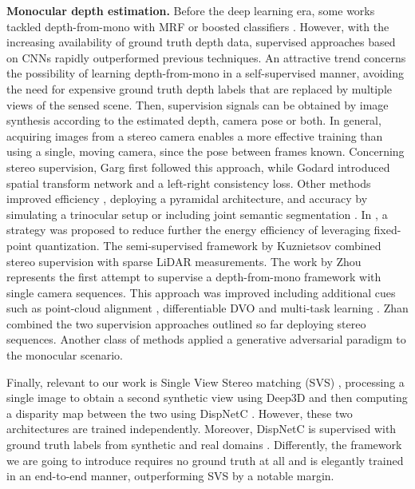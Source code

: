 \documentclass[10pt,twocolumn,letterpaper]{article}
\begin{document}
\textbf{Monocular depth estimation.}
Before the deep learning era, some works tackled depth-from-mono with MRF \cite{saxena2009make3d} or boosted classifiers \cite{ladicky2014pulling}. However, with the increasing availability of ground truth depth data, supervised approaches based on CNNs \cite{laina2016deeper,liu2016learning, xu2018supervised,fu2018supervised} rapidly outperformed previous techniques.
An attractive trend concerns the possibility of learning depth-from-mono in a self-supervised manner, avoiding the need for expensive ground truth depth labels that are replaced by multiple views of the sensed scene. Then, supervision signals can be obtained by image synthesis according to the estimated depth, camera pose or both.
In general, acquiring images from a stereo camera enables a more effective training than using a single, moving camera, since the pose between frames known.
Concerning stereo supervision, Garg \etal \cite{garg2016unsupervised} first followed this approach, while Godard \etal \cite{monodepth17} introduced spatial transform network \cite{jaderberg2015spatial} and a left-right consistency loss. Other methods improved efficiency \cite{pydnet18}, deploying a pyramidal architecture, and accuracy by simulating a trinocular setup \cite{3net18} or including joint semantic segmentation \cite{ramirez2018}. In \cite{DATE_2019}, a strategy was proposed to reduce further the energy efficiency of \cite{pydnet18} leveraging fixed-point quantization. The semi-supervised framework by Kuznietsov \etal \cite{Kuznietsov_2017_CVPR} combined stereo supervision with sparse LiDAR measurements.
The work by Zhou \etal \cite{zhou2017unsupervised} represents the first attempt to supervise a depth-from-mono framework with single camera sequences. This approach was improved including additional cues such as point-cloud alignment \cite{mahjourian2018unsupervised}, differentiable DVO \cite{wang2018unsupervised} and multi-task learning \cite{zou2018df}. Zhan \etal \cite{zhan2018unsupervised} combined the two supervision approaches outlined so far deploying stereo sequences.
Another class of methods \cite{atapour2018real, Aleotti_monogan_2018, kumar2018gan} applied a generative adversarial paradigm to the monocular scenario.

Finally, relevant to our work is Single View Stereo matching (SVS) \cite{luo2018single}, processing a single image to obtain a second synthetic view using Deep3D \cite{xie2016deep3d} and then computing a disparity map between the two using DispNetC \cite{Mayer_2016_CVPR}. However, these two architectures are trained independently. Moreover, DispNetC is supervised with ground truth labels from synthetic \cite{Mayer_2016_CVPR} and real domains \cite{KITTI_2015}. Differently, the framework we are going to introduce requires no ground truth at all and is elegantly trained in an end-to-end manner, outperforming SVS by a notable margin.
\end{document}

